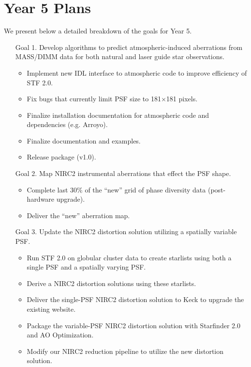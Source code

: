 \section{Year 5 Plans}
\label{sec:year5}

We present below a detailed breakdown of the goals for Year 5. 
\begin{enumerate}
\item[Goal 1.] Develop algorithms to predict atmospheric-induced aberrations
  from MASS/DIMM data for both natural and laser guide star
  observations.
  \begin{itemize}
  \item Implement new IDL interface to atmospheric code to improve
    efficiency of STF 2.0.
  \item Fix bugs that currently limit PSF size to 181$\times$181
    pixels.
  \item Finalize installation documentation for atmospheric code and
    dependencies (e.g. Arroyo). 
  \item Finalize documentation and examples.
  \item Release package (v1.0).
  \end{itemize}

\item[Goal 2.] Map NIRC2 instrumental aberrations that effect the PSF
  shape.
  \begin{itemize}
  \item Complete last 30\% of the ``new'' grid of phase diversity
    data (post-hardware upgrade).
  \item Deliver the ``new'' aberration map.
  \end{itemize}

\item[Goal 3.] Update the NIRC2 distortion solution utilizing a spatially
  variable PSF.
  \begin{itemize}
  \item Run STF 2.0 on globular cluster data to create starlists using
    both a single PSF and a spatially varying PSF.
  \item Derive a NIRC2 distortion solutions using these starlists.
  \item Deliver the single-PSF NIRC2 distortion solution to Keck to
    upgrade the existing website.
  \item Package the variable-PSF NIRC2 distortion solution with
    Starfinder 2.0 and AO Optimization.
  \item Modify our NIRC2 reduction pipeline to utilize the new
    distortion solution.
  \end{itemize}


\end{enumerate}

